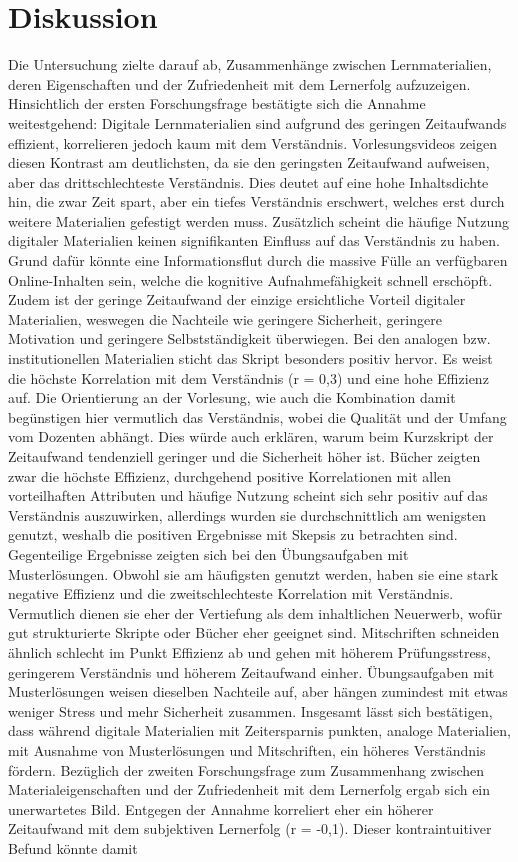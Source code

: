 \documentclass[a4paper, 12pt]{article}
\begin{document}
\section{Diskussion}
Die Untersuchung zielte darauf ab, Zusammenhänge zwischen Lernmaterialien, deren Eigenschaften und der Zufriedenheit mit dem Lernerfolg aufzuzeigen. Hinsichtlich der ersten Forschungsfrage bestätigte sich die Annahme weitestgehend: Digitale Lernmaterialien sind aufgrund des geringen Zeitaufwands effizient, korrelieren jedoch kaum mit dem Verständnis. Vorlesungsvideos zeigen diesen Kontrast am deutlichsten, da sie den geringsten Zeitaufwand aufweisen, aber das drittschlechteste Verständnis. Dies deutet auf eine hohe Inhaltsdichte hin, die zwar Zeit spart, aber ein tiefes Verständnis erschwert, welches erst durch weitere Materialien gefestigt werden muss. Zusätzlich scheint die häufige Nutzung digitaler Materialien keinen signifikanten Einfluss auf das Verständnis zu haben. Grund dafür könnte eine Informationsflut durch die massive Fülle an verfügbaren Online-Inhalten sein, welche die kognitive Aufnahmefähigkeit schnell erschöpft. Zudem ist der geringe Zeitaufwand der einzige ersichtliche Vorteil digitaler Materialien, weswegen die Nachteile wie geringere Sicherheit, geringere Motivation und geringere Selbstständigkeit überwiegen. Bei den analogen bzw. institutionellen Materialien sticht das Skript besonders positiv hervor. Es weist die höchste Korrelation mit dem Verständnis (r = 0,3) und eine hohe Effizienz auf. Die Orientierung an der Vorlesung, wie auch die Kombination damit begünstigen hier vermutlich das Verständnis, wobei die Qualität und der Umfang vom Dozenten abhängt. Dies würde auch erklären, warum beim Kurzskript der Zeitaufwand tendenziell geringer und die Sicherheit höher ist. Bücher zeigten zwar die höchste Effizienz, durchgehend positive Korrelationen mit allen vorteilhaften Attributen und häufige Nutzung scheint sich sehr positiv auf das Verständnis auszuwirken, allerdings wurden sie durchschnittlich am wenigsten genutzt, weshalb die positiven Ergebnisse mit Skepsis zu betrachten sind. Gegenteilige Ergebnisse zeigten sich bei den Übungsaufgaben mit Musterlösungen. Obwohl sie am häufigsten genutzt werden, haben sie eine stark negative Effizienz und die zweitschlechteste Korrelation mit Verständnis. Vermutlich dienen sie eher der Vertiefung als dem inhaltlichen Neuerwerb, wofür gut strukturierte Skripte oder Bücher eher geeignet sind. Mitschriften schneiden ähnlich schlecht im Punkt Effizienz ab und gehen mit höherem Prüfungsstress, geringerem Verständnis und höherem Zeitaufwand einher. Übungsaufgaben mit Musterlösungen weisen dieselben Nachteile auf, aber hängen zumindest mit etwas weniger Stress und mehr Sicherheit zusammen. Insgesamt lässt sich bestätigen, dass während digitale Materialien mit Zeitersparnis punkten, analoge Materialien, mit Ausnahme von Musterlösungen und Mitschriften, ein höheres Verständnis fördern. Bezüglich der zweiten Forschungsfrage zum Zusammenhang zwischen Materialeigenschaften und der Zufriedenheit mit dem Lernerfolg ergab sich ein unerwartetes Bild. Entgegen der Annahme korreliert eher ein höherer Zeitaufwand mit dem subjektiven Lernerfolg (r = -0,1). Dieser kontraintuitiver Befund könnte damit 
\end{document}

